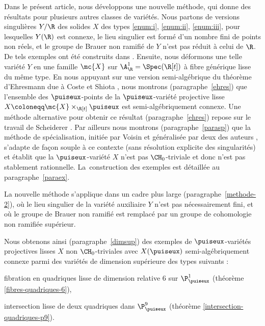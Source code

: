 Dans le présent article, nous développons une nouvelle méthode, qui
donne des résultats pour plusieurs autres classes de variétés. Nous partons de versions singulières $Y/\R$ des solides $X$ des types \eqref{enum:i}, \eqref{enum:ii}, \eqref{enum:iii}, pour lesquelles
$Y(\R)$ est connexe, le lieu singulier est formé d'un nombre fini de points non réels,
et le groupe de Brauer non ramifié de $Y$ n'est pas réduit à celui de $\R$. De tels exemples ont été construits dans \cite{colliot2024certaines}.
Ensuite, nous déformons une telle variété $Y$ en une famille $\mc{X}$ sur $\A^1_\R=\Spec (\R[t])$ à fibre générique lisse du même type. En nous appuyant sur une version semi-algébrique du théorème d'Ehresmann due à Coste et Shiota \cite{coste1992nash}, nous montrons (paragraphe~\ref{ehres}) que l'ensemble des $\puiseux$-points de la $\puiseux$-variété projective lisse $X\coloneqq \mc{X}\times_{\R[t]}\puiseux$ est semi-algébriquement connexe. Une méthode alternative pour obtenir ce résultat (paragraphe~\ref{ehres}) repose sur le travail de Scheiderer \cite{scheiderer1994real}.
Par ailleurs nous montrons (paragraphe~\ref{parasp}) que la méthode de spécialisation, initiée par Voisin et généralisée par deux des auteurs \cite{colliot2016hypersurfaces}, s'adapte de façon souple à ce contexte
(sans résolution explicite des singularités)
et établit que la $\puiseux$-variété $X$ n'est pas
$\CH_0$-triviale et donc n'est pas stablement rationnelle. La~construction des exemples est détaillée au paragraphe~\ref{paraex}.

\medskip

La nouvelle méthode s'applique dans un cadre plus large (paragraphe~\ref{methode-2}),
où le lieu singulier de la variété auxiliaire $Y$ n'est pas
nécessairement fini, et où le groupe de Brauer non ramifié est remplacé par un groupe de cohomologie non ramifiée supérieur.

Nous obtenons ainsi (paragraphe~\ref{dimsup}) des exemples de $\puiseux$-variétés projectives lisses $X$ non $\CH_0$-triviales avec $X(\puiseux)$ semi-algébriquement connexe
parmi des variétés de dimension supérieure des types suivants :
\begin{enumeratei}\setcounter{enumi}{3}
\item\label{enum:iv} fibration en quadriques lisse de dimension relative $6$ sur $\P^1_{\puiseux}$ (théorème \ref{fibres-quadriques-6}),
\item\label{enum:v} intersection lisse de deux quadriques dans $\P^9_{\puiseux}$ (théorème \ref{intersection-quadriques-p9}).
\end{enumeratei}

